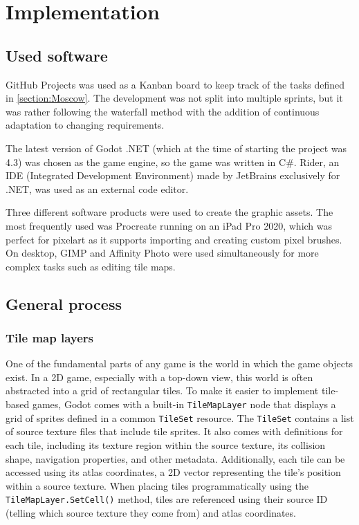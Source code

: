 \chapter{Implementation} \label{Chapter:Implementation}

\section{Used software}

GitHub Projects\cite{gitHub} was used as a Kanban board to keep track of the tasks defined in \ref{section:Moscow}. The development was not split into multiple sprints, but it was rather following the waterfall method with the addition of continuous adaptation to changing requirements.

The latest version of Godot .NET (which at the time of starting the project was 4.3) was chosen as the game engine, so the game was written in C\#. Rider, an IDE (Integrated Development Environment) made by JetBrains exclusively for .NET, was used as an external code editor. 

Three different software products were used to create the graphic assets. The most frequently used was Procreate running on an iPad Pro 2020, which was perfect for pixelart as it supports importing and creating custom pixel brushes. On desktop, GIMP and Affinity Photo were used simultaneously for more complex tasks such as editing tile maps.



\section{General process}



\subsection{Tile map layers}

One of the fundamental parts of any game is the world in which the game objects exist. In a 2D game, especially with a top-down view, this world is often abstracted into a grid of rectangular tiles. To make it easier to implement tile-based games, Godot comes with a built-in \verb|TileMapLayer| node that displays a grid of sprites defined in a common \verb|TileSet| resource. The \verb|TileSet| contains a list of source texture files that include tile sprites. It also comes with definitions for each tile, including its texture region within the source texture, its collision shape, navigation properties, and other metadata. Additionally, each tile can be accessed using its atlas coordinates, a 2D vector representing the tile's position within a source texture. When placing tiles programmatically using the \verb|TileMapLayer.SetCell()| method, tiles are referenced using their source ID (telling which source texture they come from) and atlas coordinates.

